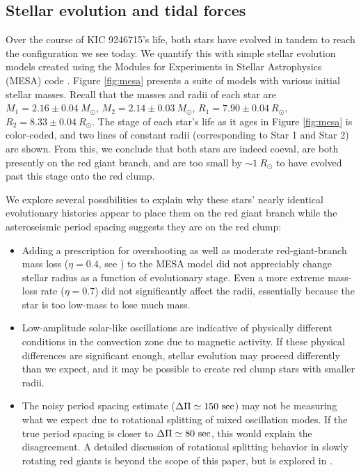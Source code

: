 \subsection{Stellar evolution and tidal forces}\label{tides}

Over the course of KIC 9246715's life, both stars have evolved in tandem to reach the configuration we see today. We quantify this with simple stellar evolution models created using the Modules for Experiments in Stellar Astrophysics (MESA) code \citep{pax11,pax13,pax15}. Figure \ref{fig:mesa} presents a suite of models with various initial stellar masses. Recall that the masses and radii of each star are $M_1 = 2.16 \pm 0.04\ M_{\odot}$, $M_2 = 2.14 \pm 0.03\ M_{\odot}$, $R_1 = 7.90 \pm 0.04 \ R_{\odot}$, $R_2 = 8.33 \pm 0.04 \ R_{\odot}$. The stage of each star's life as it ages in Figure \ref{fig:mesa} is color-coded, and two lines of constant radii (corresponding to Star 1 and Star 2) are shown. From this, we conclude that both stars are indeed coeval, are both presently on the red giant branch, and are too small by $\sim 1 \ R_\odot$ to have evolved past this stage onto the red clump.

We explore several possibilities to explain why these stars' nearly identical evolutionary histories appear to place them on the red giant branch while the asteroseismic period spacing suggests they are on the red clump:
\begin{itemize}
\item Adding a prescription for overshooting as well as moderate red-giant-branch mass loss ($\eta = 0.4$, see \citet{mig12}) to the MESA model did not appreciably change stellar radius as a function of evolutionary stage. Even a more extreme mass-loss rate ($\eta = 0.7$) did not significantly affect the radii, essentially because the star is too low-mass to lose much mass.
\item Low-amplitude solar-like oscillations are indicative of physically different conditions in the convection zone due to magnetic activity. If these physical differences are significant enough, stellar evolution may proceed differently than we expect, and it may be possible to create red clump stars with smaller radii.
\item The noisy period spacing estimate ($\Delta \Pi \simeq 150 \ \rm{sec}$) may not be measuring what we expect due to rotational splitting of mixed oscillation modes. If the true period spacing is closer to $\Delta \Pi \simeq 80 \ \rm{sec}$, this would explain the disagreement. A detailed discussion of rotational splitting behavior in slowly rotating red giants is beyond the scope of this paper, but is explored in \citet{gou13}.
\end{itemize}

